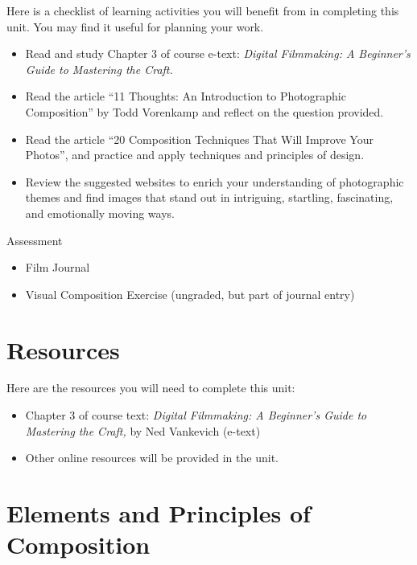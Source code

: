\documentclass[
]{book}
\providecommand{\tightlist}{%
  \setlength{\itemsep}{0pt}\setlength{\parskip}{0pt}}
\begin{document}
\begin{reflect}
Here is a checklist of learning activities you will benefit from in completing this unit. You may find it useful for planning your work.

\begin{itemize}
\tightlist
\item
  Read and study Chapter 3 of course e-text: \emph{Digital Filmmaking: A Beginner's Guide to Mastering the Craft.}
\item
  Read the article ``11 Thoughts: An Introduction to Photographic Composition'' by Todd Vorenkamp and reflect on the question provided.
\item
  Read the article ``20 Composition Techniques That Will Improve Your Photos'', and practice and apply techniques and principles of design.
\item
  Review the suggested websites to enrich your understanding of photographic themes and find images that stand out in intriguing, startling, fascinating, and emotionally moving ways.
\end{itemize}

{Assessment}

\begin{itemize}
\tightlist
\item
  Film Journal\\
\item
  Visual Composition Exercise (ungraded, but part of journal entry)
\end{itemize}
\end{reflect}

\hypertarget{resources-2}{%
\section*{Resources}\label{resources-2}}

Here are the resources you will need to complete this unit:

\begin{itemize}
\tightlist
\item
  Chapter 3 of course text: \emph{Digital Filmmaking: A Beginner's Guide to Mastering the Craft,} by Ned Vankevich (e-text)
\item
  Other online resources will be provided in the unit.
\end{itemize}

\hypertarget{elements-and-principles-of-composition}{%
\section{Elements and Principles of Composition}\label{elements-and-principles-of-composition}}
\end{document}

